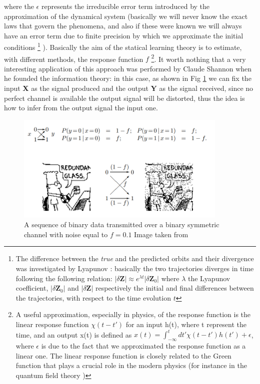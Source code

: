 \documentclass[
12pt, %
a4paper, %
oneside, %
headinclude,footinclude, %
BCOR5mm, %
]{scrartcl}
\begin{document}
where the $\epsilon$ represents the irreducible error term introduced by the approximation of the dynamical system (basically we will never know the exact laws that govern the phenomena, and also if these were known we will always have an error term due to finite precision by which we approximate the initial conditions \cite{prigogine2018order,prigogine1997end,petrosky1996liouville}\footnote{The difference between the \textit{true} and the predicted orbits and their divergence was investigated by Lyapunov \cite{liapounoff1907probleme}: basically the two trajectories diverges in time following the following relation: $ \lvert \delta\textbf{Z} \rvert \approx e^{\lambda t} \lvert \delta\textbf{Z}_{0} \rvert $ where  $\lambda$ the Lyapunov coefficient, $\lvert \delta\textbf{Z}_{0} \rvert$ and  $\lvert \delta\textbf{Z} \rvert $ respectively  the initial and final differences between the trajectories, with respect to the time evolution $t$}  ). Basically the aim of the statical learning theory is to estimate, with different methods, the response function $f$ \footnote{A useful approximation, especially in physics, of the response function is the linear response function $\chi(t-t')$ for an input h(t), where t represent the time, and an output x(t) is defined as $x(t)=\int_{-\infty}^{t}dt'\chi(t-t')h(t')+\epsilon$, where $\epsilon$ is due to the fact that we approximated the response function as a linear one. The linear response function is closely related to the Green function that plays a crucial role in the modern physics (for instance in the quantum field theory \cite{kubo1957statistical,zee2010quantum})}. It worth nothing that a very interesting application of this approach was performed by Claude Shannon \cite{shannon2001mathematical,mackay2003information} when he founded the information theory: in this case, as shown in Fig \ref{Noisy_channel} we can fix the input \textbf{X} as the signal produced and the output \textbf{Y} as the signal received, since no perfect channel is available the output signal will be distorted, thus the idea is how to infer from the output signal the input one.
\begin{figure}[h]
\begin{center}
\includegraphics[width=0.9\textwidth]{Pic/Noisy_channel.png}
\caption{A sequence of binary data transmitted over a binary symmetric channel with noise equal to $f=0.1$   Image taken from \cite{mackay2003information}}
\label{Noisy_channel}
\end{center}
\end{figure}
\end{document}
